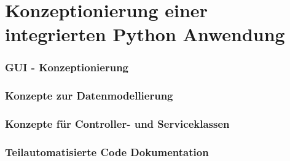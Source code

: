 

\chapter{Konzeptionierung einer integrierten Python Anwendung}

\subsection{GUI - Konzeptionierung}

\subsection{Konzepte zur Datenmodellierung}

\subsection{Konzepte für Controller- und Serviceklassen}

\subsection{Teilautomatisierte Code Dokumentation}